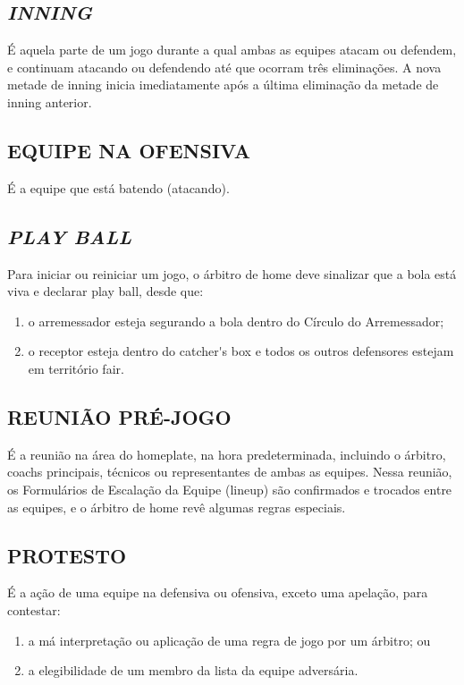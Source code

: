 \subsection{\textit{INNING}}
É aquela parte de um jogo durante a qual ambas as equipes atacam ou defendem, e continuam atacando ou defendendo até que ocorram três eliminações. A nova metade de \gls{inning} inicia imediatamente após a última  eliminação da metade de \gls{inning} anterior.

\subsection{EQUIPE NA OFENSIVA}
É a equipe que está batendo (atacando).

\subsection{\textit{PLAY BALL}}
Para iniciar ou reiniciar um jogo, o árbitro de \gls{home} deve sinalizar que a bola
está viva e declarar \gls{play ball}, desde que:
\begin{enumerate}[label=(\alph*)]
	\item  o arremessador esteja segurando a bola dentro do Círculo do Arremessador;
	\item  o receptor esteja dentro do \gls{catcher's box} e todos os outros  defensores estejam em território \gls{fair}.
\end{enumerate}

\subsection{REUNIÃO PRÉ-JOGO}

É a reunião na área do \gls{homeplate}, na hora predeterminada, incluindo o árbitro, \glspl{coach} principais, técnicos ou representantes de ambas as equipes. Nessa  reunião, os Formulários de Escalação da Equipe (\gls{lineup}) são confirmados e trocados entre as equipes, e o árbitro de \gls{home} revê algumas regras especiais.

\subsection{PROTESTO}

É a ação de uma equipe na defensiva ou ofensiva, exceto uma apelação, para  contestar:

\begin{enumerate}[label=(\alph*)]
	\item  a má interpretação ou aplicação de uma regra de jogo por um árbitro; ou
	\item  a elegibilidade de um membro da lista da equipe adversária.
\end{enumerate}

